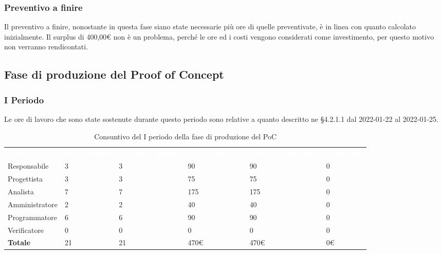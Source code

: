 \subsubsection{Preventivo a finire}
Il preventivo a finire, nonostante in questa fase siano state necessarie più ore di quelle preventivate, è in linea con quanto calcolato inizialmente. Il surplus di 400,00\euro \xspace non è un problema, perché le ore ed i costi vengono considerati come investimento, per questo motivo non verranno rendicontati.

\pagebreak

\subsection{Fase di produzione del Proof of Concept}

\subsubsection{I Periodo}
Le ore di lavoro che sono state sostenute durante questo periodo sono relative a quanto descritto ne §4.2.1.1 dal 2022-01-22 al 2022-01-25.

\begin{table}[H]
\begin{center}
\renewcommand{\arraystretch}{1.5}
\begin{tabular}{ m{}<{\centering}  m{}<{\centering} m{}<{\centering} m{}<{\centering} m{}<{\centering} m{}<{\centering}}
	\rowcolor{darkblue}
	\textcolor{white}{\textbf{Ruolo}} & \textcolor{white}{\textbf{Ore Effettive}} & \textcolor{white}{\textbf{Ore Preventivate}}&\textcolor{white}{\textbf{Costo Effettivo}}&\textcolor{white}{\textbf{Costo Preventivato}}&\textcolor{white}{\textbf{Differenza}}\\ 
	
	Responsabile  & 3 & 3 & 90 & 90 & 0 \\	
	
	Progettista & 3 & 3 & 75 & 75 & 0 \\
	
	Analista & 7 & 7 & 175 & 175 & 0 \\

	Amministratore & 2 & 2 & 40 & 40 & 0 \\
	
	Programmatore & 6 & 6 & 90 & 90 &  0 \\
	
	Verificatore & 0 & 0 & 0 & 0 & 0 \\
	
	\textbf{Totale} & 21 & 21 & 470\euro & 470\euro & 0\euro \\
	
\end{tabular}
\caption{Consuntivo del I periodo della fase di produzione del PoC}
\end{center}
\end{table}


